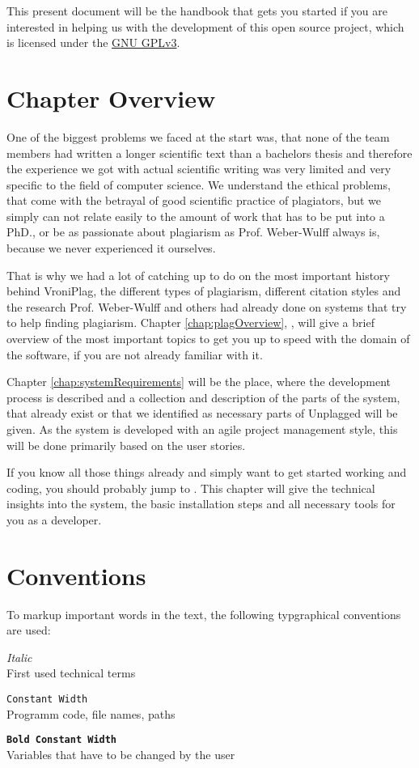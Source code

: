 This present document will be the handbook that gets you started if you are interested in helping us with the development of this 
open source project, which is licensed under the \href{http://www.gnu.org/licenses/quick-guide-gplv3}{GNU GPLv3}.

\section*{Chapter Overview}

One of the biggest problems we faced at the start was, that none of the team members had written a longer scientific
text than a bachelors
thesis and therefore the experience we got with actual scientific writing was very limited and very specific to the 
field of computer science. We understand the ethical problems, that come with the betrayal of 
good scientific practice of plagiators, but we simply can not relate easily to the amount of work that has to be put into 
a PhD., or be as 
passionate about plagiarism as Prof. Weber-Wulff always is, because we never experienced it ourselves.

That is why we had a lot of catching up to do on the most important history behind VroniPlag, the different types
of plagiarism, different citation styles and the research Prof. Weber-Wulff and others had already done on systems that try to 
help finding plagiarism. Chapter \ref{chap:plagOverview}, , will
give a brief overview of the most important topics to get you up to speed with the domain of the software, if you are
not already familiar with it.

Chapter \ref{chap:systemRequirements} will be the place, where the development process is described and a collection and description 
of the parts of the system, that already exist or that we identified as 
necessary parts of Unplagged will be given. As the system is developed with an agile project management style, this will be done
primarily based on the user stories.

If you know all those things already and simply want to get started working and coding, you should probably jump
to . This chapter will give the technical insights into the system, the basic installation
steps and all necessary tools for you as a developer.

\section*{Conventions}

To markup important words in the text, the following typgraphical conventions are used:

\begin{description}
\item \textit{Italic} \hfill \\
  First used technical terms
\item \texttt{Constant Width} \hfill \\
  Programm code, file names, paths
\item \textbf{\texttt{Bold Constant Width}} \hfill \\
  Variables that have to be changed by the user
\end{description}
